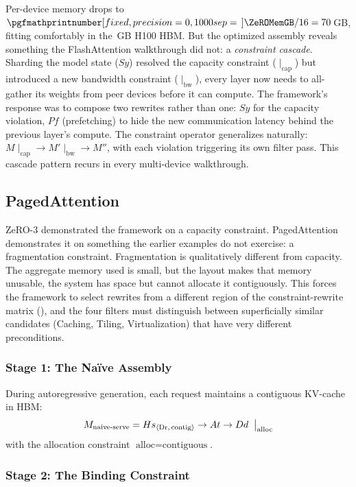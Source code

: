 \documentclass[10pt,twocolumn]{article}
\newcommand{\cvalint}[1]{\pgfmathprintnumber[fixed, precision=0, 1000 sep={\,}]{#1}}
\begin{document}
Per-device memory drops to $\cvalint{\ZeROMemGB} / 16 = 70$\,GB, fitting comfortably in the \cvalint{\HhHBMGB}\,GB H100 HBM. But the optimized assembly reveals something the FlashAttention walkthrough did not: a \emph{constraint cascade}. Sharding the model state ($Sy$) resolved the capacity constraint ($\mid_{\text{cap}}$) but introduced a new bandwidth constraint ($\mid_{\text{bw}}$), every layer now needs to all-gather its weights from peer devices before it can compute. The framework's response was to compose two rewrites rather than one: $Sy$ for the capacity violation, $Pf$ (prefetching) to hide the new communication latency behind the previous layer's compute. The constraint operator generalizes naturally: $M \mid_{\text{cap}} \to M' \mid_{\text{bw}} \to M''$, with each violation triggering its own filter pass. This cascade pattern recurs in every multi-device walkthrough.

\subsection{PagedAttention}
\label{sec:paged-attention}

ZeRO-3 demonstrated the framework on a capacity constraint. PagedAttention demonstrates it on something the earlier examples do not exercise: a fragmentation constraint. Fragmentation is qualitatively different from capacity. The aggregate memory used is small, but the layout makes that memory unusable, the system has space but cannot allocate it contiguously. This forces the framework to select rewrites from a different region of the constraint-rewrite matrix (), and the four filters must distinguish between superficially similar candidates (Caching, Tiling, Virtualization) that have very different preconditions.

\subsubsection{Stage 1: The Na\"ive Assembly}

During autoregressive generation, each request maintains a contiguous KV-cache in HBM:
\begin{equation*}
M_{\text{naive-serve}} = Hs_{\langle \text{Dr},\, \text{contig} \rangle} \rightarrow At \rightarrow Dd \;\bigm|_{\text{alloc}}
\end{equation*}
with the allocation constraint $\text{alloc} = \text{contiguous}$.

\subsubsection{Stage 2: The Binding Constraint}
\end{document}
